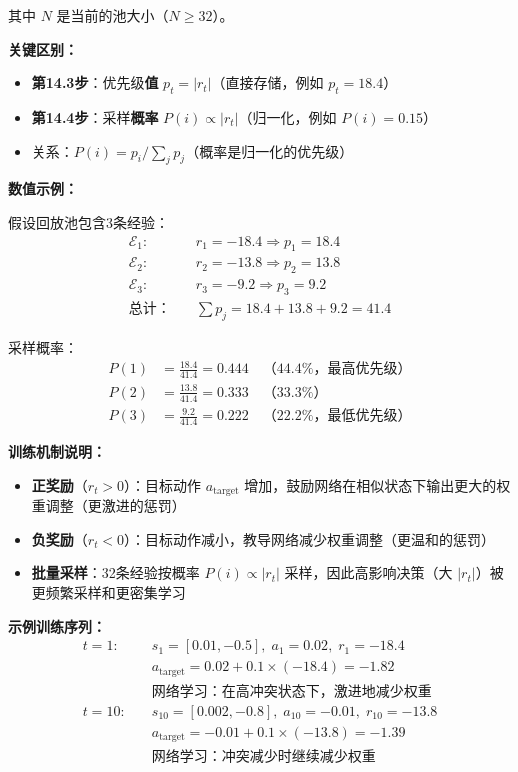 \documentclass[11pt,a3paper]{ctexart}
\begin{document}
其中 $N$ 是当前的池大小（$N \geq 32$）。

\textbf{关键区别：}
\begin{itemize}
    \item \textbf{第14.3步}：优先级\textbf{值} $p_t = |r_t|$（直接存储，例如 $p_t = 18.4$）
    \item \textbf{第14.4步}：采样\textbf{概率} $P(i) \propto |r_t|$（归一化，例如 $P(i) = 0.15$）
    \item 关系：$P(i) = p_i / \sum_j p_j$（概率是归一化的优先级）
\end{itemize}

\textbf{数值示例：}

假设回放池包含3条经验：
\begin{align*}
\mathcal{E}_1: & \quad r_1 = -18.4 \Rightarrow p_1 = 18.4 \\
\mathcal{E}_2: & \quad r_2 = -13.8 \Rightarrow p_2 = 13.8 \\
\mathcal{E}_3: & \quad r_3 = -9.2 \Rightarrow p_3 = 9.2 \\
\text{总计：} & \quad \sum p_j = 18.4 + 13.8 + 9.2 = 41.4
\end{align*}

采样概率：
\begin{align*}
P(1) &= \frac{18.4}{41.4} = 0.444 \quad \text{（44.4\%，最高优先级）} \\
P(2) &= \frac{13.8}{41.4} = 0.333 \quad \text{（33.3\%）} \\
P(3) &= \frac{9.2}{41.4} = 0.222 \quad \text{（22.2\%，最低优先级）}
\end{align*}

\textbf{训练机制说明：}
\begin{itemize}
    \item \textbf{正奖励}（$r_t > 0$）：目标动作 $a_{\text{target}}$ 增加，鼓励网络在相似状态下输出更大的权重调整（更激进的惩罚）
    \item \textbf{负奖励}（$r_t < 0$）：目标动作减小，教导网络减少权重调整（更温和的惩罚）
    \item \textbf{批量采样}：32条经验按概率 $P(i) \propto |r_t|$ 采样，因此高影响决策（大 $|r_t|$）被更频繁采样和更密集学习
\end{itemize}

\textbf{示例训练序列：}
\begin{align*}
t=1: \quad & s_1 = [0.01, -0.5], \; a_1 = 0.02, \; r_1 = -18.4 \\
           & a_{\text{target}} = 0.02 + 0.1 \times (-18.4) = -1.82 \\
           & \text{网络学习：在高冲突状态下，激进地减少权重} \\[5pt]
t=10: \quad & s_{10} = [0.002, -0.8], \; a_{10} = -0.01, \; r_{10} = -13.8 \\
            & a_{\text{target}} = -0.01 + 0.1 \times (-13.8) = -1.39 \\
            & \text{网络学习：冲突减少时继续减少权重}
\end{align*}
\end{document}
